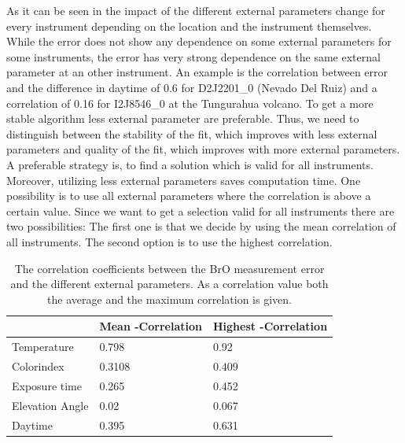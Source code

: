\documentclass  [
  paper    = a4,
  BCOR     = 10mm,
  twoside,
  fontsize = 12pt,
  fleqn,
  toc      = bibnumbered,
  toc      = listofnumbered,
  numbers  = noendperiod,
  headings = normal,
  listof   = leveldown,
  version  = 3.03
]                                       {scrreprt}
\begin{document}
	As it can be seen in  the impact of the different external parameters change for every instrument depending on the location and the instrument themselves. 
	While the   error does not show any dependence on some external parameters for some instruments, the error has very strong dependence on the same external parameter at an other instrument. An example is the correlation between   error and the difference in daytime of 0.6 for D2J2201\_0 (Nevado Del Ruiz) and a correlation of 0.16 for I2J8546\_0 at the Tungurahua volcano.
	To get a more stable algorithm less external parameter are preferable. Thus, we need to distinguish between the stability of the fit, which improves with less external parameters and quality of the fit, which improves with more external parameters. 
	A preferable strategy is, to find a solution which is valid for all instruments. Moreover, utilizing less external parameters saves computation time.
	One possibility is to use all external parameters where the correlation is above a certain value. Since we want to get a selection valid for all instruments there are two possibilities: The first one is that we decide by using the mean correlation of all instruments. The second option is to use the highest correlation.
	
	\begin{table}[h]
		\centering
		\begin{tabular}{|p{4cm}|p{3cm}|p{3cm}|}
			&  Mean -Correlation&  Highest   -Correlation\\
			\toprule
			Temperature &0.798&	0.92\\
			\midrule
			Colorindex &0.3108&	0.409\\
			\midrule
			Exposure time &0.265&	0.452\\
			\midrule
			Elevation Angle &0.02&	0.067\\
			\midrule
			Daytime &0.395&	0.631\\
			\bottomrule		
		\end{tabular}
	\label{tab:CorrEP}
	\caption{The correlation coefficients between the BrO measurement error and the different external parameters. As a correlation value both the average and the maximum correlation is given.}
	\end{table}
\end{document}
